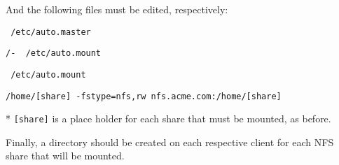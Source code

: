 \noindent
And the following files must be edited, respectively: \\

\begin{lstlisting}
 /etc/auto.master
\end{lstlisting}
\vspace{1em}

\begin{lstlisting}[backgroundcolor=\color{Gray}]
 /-  /etc/auto.mount
\end{lstlisting}
\vspace{1em}

\begin{lstlisting}
 /etc/auto.mount
\end{lstlisting}
\vspace{1em}

\begin{lstlisting}[backgroundcolor=\color{Gray}]
 /home/[share] -fstype=nfs,rw nfs.acme.com:/home/[share]
\end{lstlisting}
* \lstinline$[share]$ is a place holder for each share that must be mounted, 
as before.
\vspace{2em}

\noindent
Finally, a directory should be created on each respective client for each NFS
share that will be mounted. \\
